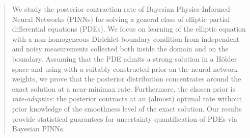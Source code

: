\documentclass{article}
\theoremstyle{plain}
\theoremstyle{definition}
\theoremstyle{remark}
\begin{document}
\printAffiliationsAndNotice{}  %

\begin{abstract}
  We study the posterior contraction rate of Bayesian Physics-Informed Neural Networks (PINNs) for solving a general class of elliptic partial differential equations (PDEs). We focus on learning of the elliptic equation with a non-homogeneous Dirichlet boundary condition from independent and noisy measurements collected both inside the domain and on the boundary. Assuming that the PDE admits a  strong solution in a  H\"older space and using with a suitably constructed prior  on the neural network weights, we prove that the posterior distribution  concentrates around the exact solution at a near-minimax rate. Furthermore, the chosen prior is {\em rate-adaptive}: the posterior contracts at an (almost) optimal rate without prior knowledge of the  smoothness level of the exact solution. Our results provide statistical guarantees for uncertainty quantification of PDEs via Bayesian PINNs. 
\end{abstract}
\end{document}
